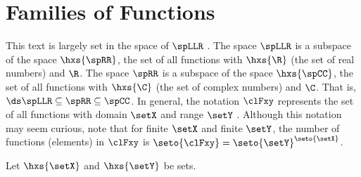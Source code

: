 \section{Families of Functions}
This text is largely set in the space of
 $\spLLR$ .
The space $\spLLR$ is a subspace of the space $\hxs{\spRR}$, the set of all functions with 
$\hxs{\R}$ (the set of real numbers) and  $\R$.
The space $\spRR$ is a subspace of the space $\hxs{\spCC}$, the set of all functions with 
$\hxs{\C}$ (the set of complex numbers) and  $\C$.
That is,
$\ds\spLLR \subseteq \spRR \subseteq \spCC$.
In general, the notation $\clFxy$ represents the set of all functions with domain $\setX$ and range $\setY$ .
Although this notation may seem curious, note that for finite $\setX$ and finite $\setY$, the number of functions (elements)
in $\clFxy$ is $\seto{\clFxy}=\seto{\setY}^\seto{\setX}$.
\begin{definition}
\label{def:spXY}
Let $\hxs{\setX}$ and $\hxs{\setY}$ be sets.
\end{definition}


